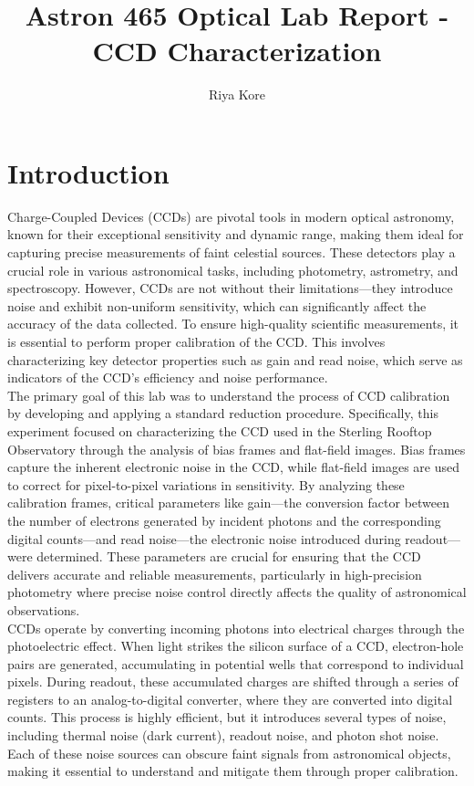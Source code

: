 \documentclass[linenumbers,twocolumn]{aastex631}
\begin{document}
\title{Astron 465 Optical Lab Report - CCD Characterization}

\author[0000-0002-3418-7817]{Riya Kore}



\section{Introduction}

Charge-Coupled Devices (CCDs) are pivotal tools in modern optical astronomy, known for their exceptional sensitivity and dynamic range, making them ideal for capturing precise measurements of faint celestial sources. These detectors play a crucial role in various astronomical tasks, including photometry, astrometry, and spectroscopy. However, CCDs are not without their limitations—they introduce noise and exhibit non-uniform sensitivity, which can significantly affect the accuracy of the data collected. To ensure high-quality scientific measurements, it is essential to perform proper calibration of the CCD. This involves characterizing key detector properties such as gain and read noise, which serve as indicators of the CCD's efficiency and noise performance. \\

The primary goal of this lab was to understand the process of CCD calibration by developing and applying a standard reduction procedure. Specifically, this experiment focused on characterizing the CCD used in the Sterling Rooftop Observatory through the analysis of bias frames and flat-field images. Bias frames capture the inherent electronic noise in the CCD, while flat-field images are used to correct for pixel-to-pixel variations in sensitivity. By analyzing these calibration frames, critical parameters like gain—the conversion factor between the number of electrons generated by incident photons and the corresponding digital counts—and read noise—the electronic noise introduced during readout—were determined. These parameters are crucial for ensuring that the CCD delivers accurate and reliable measurements, particularly in high-precision photometry where precise noise control directly affects the quality of astronomical observations. \\

CCDs operate by converting incoming photons into electrical charges through the photoelectric effect. When light strikes the silicon surface of a CCD, electron-hole pairs are generated, accumulating in potential wells that correspond to individual pixels. During readout, these accumulated charges are shifted through a series of registers to an analog-to-digital converter, where they are converted into digital counts. This process is highly efficient, but it introduces several types of noise, including thermal noise (dark current), readout noise, and photon shot noise. Each of these noise sources can obscure faint signals from astronomical objects, making it essential to understand and mitigate them through proper calibration.
\end{document}
